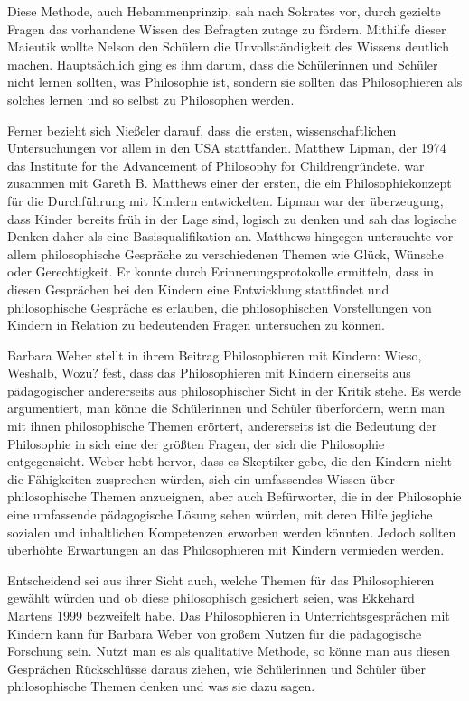 Diese Methode, auch Hebammenprinzip, sah nach Sokrates vor, durch gezielte Fragen das vorhandene Wissen des Befragten zutage zu fördern. 
Mithilfe dieser Maieutik wollte Nelson den Schülern die Unvollständigkeit des Wissens deutlich machen. 
Hauptsächlich ging es ihm darum, dass die Schülerinnen und Schüler nicht lernen sollten, was Philosophie ist, sondern sie sollten das Philosophieren als solches lernen und so selbst zu Philosophen werden\cite[S.\,618]{AN13}. 

Ferner bezieht sich Nießeler darauf, dass die ersten, wissenschaftlichen Untersuchungen vor allem in den USA stattfanden. 
Matthew Lipman, der 1974 das \glqq Institute for the Advancement of Philosophy for Children\grqq gründete, war zusammen mit Gareth B. Matthews einer der ersten, die ein Philosophiekonzept für die Durchführung mit Kindern entwickelten. 
Lipman war der überzeugung, dass Kinder bereits früh in der Lage sind, logisch zu denken und sah das logische Denken daher als eine Basisqualifikation an\cite[S.\,619]{AN13}. 
Matthews hingegen untersuchte vor allem philosophische Gespräche zu verschiedenen Themen wie \glqq Glück\grqq{}, \glqq Wünsche\grqq{} oder \glqq Gerechtigkeit\grqq{}. 
Er konnte durch Erinnerungsprotokolle ermitteln, dass in diesen Gesprächen bei den Kindern eine Entwicklung stattfindet und philosophische Gespräche es erlauben, die philosophischen Vorstellungen von Kindern in Relation zu bedeutenden Fragen untersuchen zu können.

Barbara Weber stellt in ihrem Beitrag \glqq Philosophieren mit Kindern: Wieso, Weshalb, Wozu?\grqq{} fest, dass das Philosophieren mit Kindern einerseits aus pädagogischer andererseits aus philosophischer Sicht in der Kritik stehe. 
Es werde argumentiert, man könne die Schülerinnen und Schüler überfordern, wenn man mit ihnen philosophische Themen erörtert, andererseits ist die Bedeutung der Philosophie in sich eine der größten Fragen, der sich die Philosophie entgegensieht. 
Weber hebt hervor, dass es Skeptiker gebe, die den Kindern nicht die Fähigkeiten zusprechen würden, sich ein umfassendes Wissen über philosophische Themen anzueignen, aber auch Befürworter, die in der Philosophie eine umfassende pädagogische Lösung sehen würden, mit deren Hilfe jegliche sozialen und inhaltlichen Kompetenzen erworben werden könnten\cite[S.\,623]{BW13}.
Jedoch sollten überhöhte Erwartungen an das Philosophieren mit Kindern vermieden werden. 

Entscheidend sei aus ihrer Sicht auch, welche Themen für das Philosophieren gewählt würden und ob diese philosophisch gesichert seien, was Ekkehard Martens 1999 bezweifelt habe\cite[S.\,624]{BW13}. 
Das Philosophieren in Unterrichtsgesprächen mit Kindern kann für Barbara Weber von großem Nutzen für die pädagogische Forschung sein. 
Nutzt man es als qualitative Methode, so könne man aus diesen Gesprächen Rückschlüsse daraus ziehen, wie Schülerinnen und Schüler über philosophische Themen denken und was sie dazu sagen.

